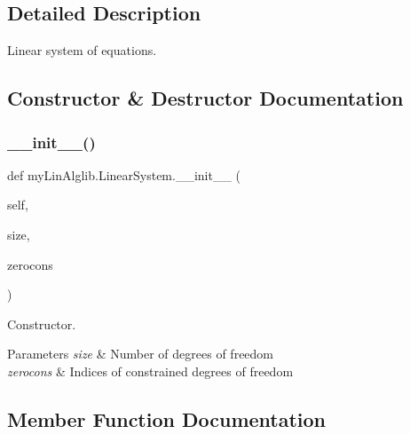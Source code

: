 \subsection{Detailed Description}
Linear system of equations. 

\subsection{Constructor \& Destructor Documentation}
\mbox{\label{classmyLinAlglib_1_1LinearSystem_abe0785c00795ca1bbf8539290e7287fc}} 
\subsubsection{\texorpdfstring{\+\_\+\+\_\+init\+\_\+\+\_\+()}{\_\_init\_\_()}}
{\footnotesize\ttfamily def my\+Lin\+Alglib.\+Linear\+System.\+\_\+\+\_\+init\+\_\+\+\_\+ (\begin{DoxyParamCaption}\item[{}]{self,  }\item[{}]{size,  }\item[{}]{zerocons }\end{DoxyParamCaption})}



Constructor. 


\begin{DoxyParams}{Parameters}
{\em size} & Number of degrees of freedom \\
\hline
{\em zerocons} & Indices of constrained degrees of freedom \\
\hline
\end{DoxyParams}


\subsection{Member Function Documentation}
\mbox{\label{classmyLinAlglib_1_1LinearSystem_a5648c3ebda07e69cd72f2cdf79fb35c7}} 
